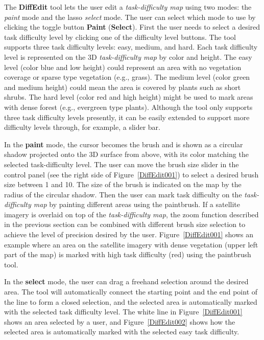 The \textbf{DiffEdit} tool lets the user edit a \textit{task-difficulty map} using two modes: the \textit{paint} mode and the lasso \textit{select} mode. The user can select which mode to use by clicking the toggle button \textbf{Paint} (\textbf{Select}). First the user needs to select a desired task difficulty level by clicking one of the difficulty level buttons. The tool supports three task difficulty levels: easy, medium, and hard. Each task difficulty level is represented on the 3D \textit{task-difficulty map} by color and height. The easy level (color blue and low height) could represent an area with no vegetation coverage or sparse type vegetation (e.g., grass). The medium level (color green and medium height) could mean the area is covered by plants such as short shrubs. The hard level (color red and high height) might be used to mark areas with dense forest (e.g., evergreen type plants). Although the tool only supports three task difficulty levels presently, it can be easily extended to support more difficulty levels through, for example, a slider bar.

In the \textbf{paint} mode, the cursor becomes the brush and is shown as a circular shadow projected onto the 3D surface from above, with its color matching the selected task-difficulty level. The user can move the brush size slider in the control panel (see the right side of Figure~\ref{DiffEdit001}) to select a desired brush size between 1 and 10. The size of the brush is indicated on the map by the radius of the circular shadow. Then the user can mark task difficulty on the \textit{task-difficulty map} by painting different areas using the paintbrush. If a satellite imagery is overlaid on top of the \textit{task-difficulty map}, the zoom function described in the previous section can be combined with different brush size selection to achieve the level of precision desired by the user. Figure~\ref{DiffEdit001} shows an example where an area on the satellite imagery with dense vegetation (upper left part of the map) is marked with high task difficulty (red) using the paintbrush tool.

In the \textbf{select} mode, the user can drag a freehand selection around the desired area. The tool will automatically connect the starting point and the end point of the line to form a closed selection, and the selected area is automatically marked with the selected task difficulty level. The white line in Figure~\ref{DiffEdit001} shows an area selected by a user, and Figure~\ref{DiffEdit002} shows how the selected area is automatically marked with the selected easy task difficulty.

